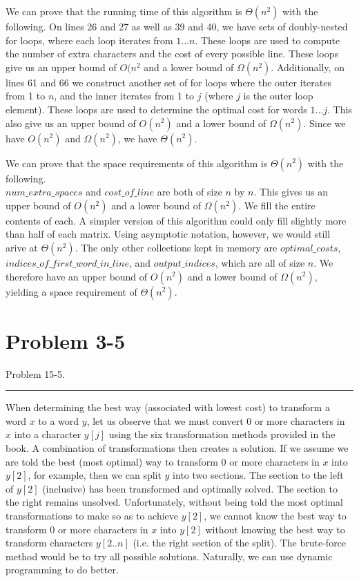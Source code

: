 \documentclass[11pt]{article}
\def\separateline{\medskip\hrule\medskip}
\begin{document}
We can prove that the running time of this algorithm is $\Theta(n^2)$ with the following. On lines 26 and 27 as well as 39 and 40, we have sets of doubly-nested for loops, where each loop iterates from $1...n$. These loops are used to compute the number of extra characters and the cost of every possible line. These loops give us an upper bound of $O(n^2$ and a lower bound of $\Omega(n^2)$. Additionally, on lines 61 and 66 we construct another set of for loops where the outer iterates from 1 to $n$, and the inner iterates from 1 to $j$ (where $j$ is the outer loop element). These loops are used to determine the optimal cost for words $1...j$. This also give us an upper bound of $O(n^2)$ and a lower bound of $\Omega(n^2)$. Since we have $O(n^2)$ and $\Omega(n^2)$, we have $\Theta(n^2)$.

We can prove that the space requirements of this algorithm is $\Theta(n^2)$ with the following. \\$num\_extra\_spaces$ and $cost\_of\_line$ are both of size $n$ by $n$. This gives us an upper bound of $O(n^2)$ and a lower bound of $\Omega(n^2)$. We fill the entire contents of each. A simpler version of this algorithm could only fill slightly more than half of each matrix. Using asymptotic notation, however, we would still arive at $\Theta(n^2)$. The only other collections kept in memory are $optimal\_costs$, $indices\_of\_first\_word\_in\_line$, and $output\_indices$, which are all of size $n$. We therefore have an upper bound of $O(n^2)$ and a lower bound of $\Omega(n^2)$, yielding a space requirement of $\Theta(n^2)$.

\newpage

\section{Problem 3-5}
Problem 15-5.
\separateline

When determining the best way (associated with lowest cost) to transform a word $x$ to a word $y$, let us observe that we must convert 0 or more characters in $x$ into a character $y[j]$ using the six transformation methods provided in the book. A combination of transformations then creates a solution. If we assume we are told the best (most optimal) way to transform 0 or more characters in $x$ into $y[2]$, for example, then we can split $y$ into two sections. The section to the left of $y[2]$ (inclusive) has been transformed and optimally solved. The section to the right remains unsolved. Unfortunately, without being told the most optimal transformations to make so as to achieve $y[2]$, we cannot know the best way to transform 0 or more characters in $x$ into $y[2]$ without knowing the best way to transform characters $y[2..n]$ (i.e. the right section of the split). The brute-force method would be to try all possible solutions. Naturally, we can use dynamic programming to do better.
\end{document}
